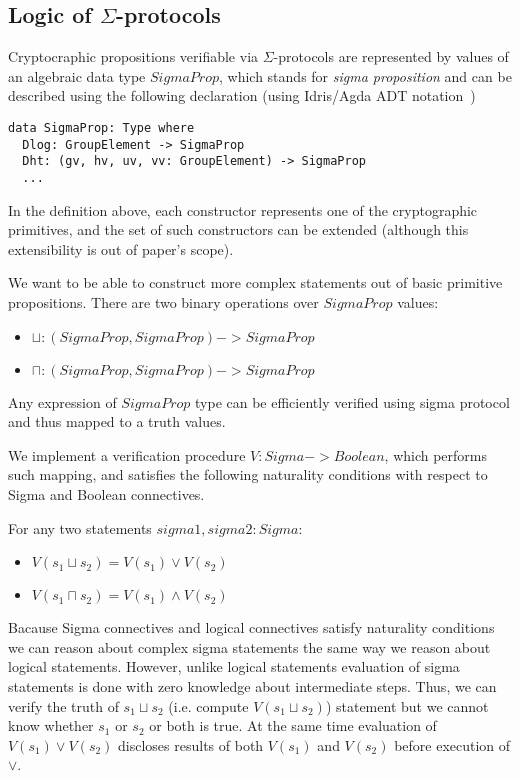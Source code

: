 \documentclass[11pt]{llncs}
\begin{document}
\subsection{Logic of $\Sigma$-protocols}

Cryptocraphic propositions verifiable via $\Sigma$-protocols are represented by values of an algebraic data type $SigmaProp$,
which stands for \emph{sigma proposition} and can be described using the following declaration (using Idris/Agda ADT notation~\cite{Idris, Agda})

\begin{lstlisting}
data SigmaProp: Type where
  Dlog: GroupElement -> SigmaProp
  Dht: (gv, hv, uv, vv: GroupElement) -> SigmaProp
  ...
\end{lstlisting}

In the definition above, each constructor represents one of the cryptographic primitives, and the set of such constructors
can be extended (although this extensibility is out of paper's scope).

We want to be able to construct more complex statements out of basic primitive propositions.
There are two binary operations over $SigmaProp$ values:
\begin{itemize}
\item $\sqcup: (SigmaProp, SigmaProp) -> SigmaProp$
\item $\sqcap: (SigmaProp, SigmaProp) -> SigmaProp$
\end{itemize}

Any expression of $SigmaProp$ type can be efficiently verified using sigma protocol and thus mapped to a truth values.

We implement a verification procedure $V: Sigma -> Boolean$, which performs such mapping, and satisfies the following
naturality conditions with respect to Sigma and Boolean connectives.

For any two statements $sigma1, sigma2: Sigma$:
\begin{itemize}
    \item $V(s_1 \sqcup s_2) = V(s_1) \lor V(s_2)$
    \item $V(s_1 \sqcap s_2) = V(s_1) \land V(s_2)$
\end{itemize}

Bacause Sigma connectives and logical connectives satisfy naturality conditions we can reason about complex sigma statements
the same way we reason about logical statements.
However, unlike logical statements evaluation of sigma statements is done with zero knowledge about intermediate steps.
Thus, we can verify the truth of $s_1 \sqcup s_2$ (i.e. compute $V(s_1 \sqcup s_2)$) statement but we cannot know whether $s_1$ or $s_2$ or both is true. At the same time evaluation of $V(s_1) \lor V(s_2)$ discloses results of both $V(s_1)$ and $V(s_2)$ before execution of $\lor$.
\end{document}
